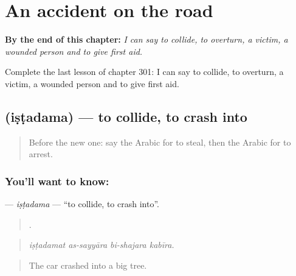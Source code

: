 
\chapter{An accident on the road}
\label{ch:ar-an-accident-on-the-road}

\begin{chapteropening}
\textbf{By the end of this chapter:} \emph{I can say to collide, to overturn, a victim, a wounded person and to give first aid.}

Complete the last lesson of chapter 301: I can say to collide, to overturn, a victim, a wounded person and to give first aid.
\end{chapteropening}

\section[\texorpdfstring{\ar{اصطدم} (iṣṭadama)}{اصطدم (iṣṭadama)}]{ (iṣṭadama) — to collide, to crash into}

\label{lesson:AR-C301-istadama}



\begin{quote}
Before the new one: say the Arabic for to steal, then the Arabic for to arrest.
\end{quote}

\subsection*{You'll want to know: }
\textbf{} — \emph{iṣṭadama} — \textquotedblleft{}to collide, to crash into\textquotedblright{}.

\begin{quote}
   .
\end{quote}

\begin{quote}
\emph{iṣṭadamat as-sayyāra bi-shajara kabīra.}
\end{quote}

\begin{quote}
The car crashed into a big tree.
\end{quote}


